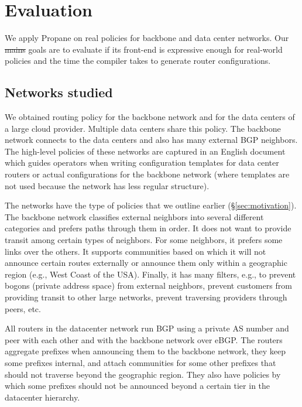 \documentclass{sig-alternate-10pt}
\newcommand{\sysname}{{\small \sf Propane}\xspace}
\providecommand{\DIFadd}[1]{{\protect\color{blue}\uwave{#1}}} %
\providecommand{\DIFdel}[1]{{\protect\color{red}\sout{#1}}}                      %
\providecommand{\DIFaddbegin}{} %
\providecommand{\DIFaddend}{} %
\providecommand{\DIFdelbegin}{} %
\providecommand{\DIFdelend}{} %
\begin{document}
\DIFdelend \section{Evaluation}
\label{sec:evaluation}


We apply \sysname on real policies for backbone and data center networks. Our \DIFdelbegin \DIFdel{mains }\DIFdelend \DIFaddbegin \DIFadd{main }\DIFaddend goals are to evaluate if its front-end is expressive enough for real-world policies and the time the compiler takes to generate router configurations.

\subsection{Networks studied}

We obtained routing policy for the backbone network and for the data centers of a large cloud provider. Multiple data centers share this policy. The backbone network connects to the data centers and also has many external BGP neighbors. The high-level policies of these networks are captured in an English document which guides operators when writing configuration templates for data center routers or actual configurations for the backbone network (where templates are not used because the network has less regular structure).

The networks have the type of policies that we outline earlier (\S\ref{sec:motivation}). The backbone network classifies external neighbors into several different categories and prefers paths through them in order. It does not want to provide transit among certain types of neighbors. For some neighbors, it prefers some links over the others. It supports communities based on which it will not announce certain routes externally or announce them only within a geographic region (e.g., West Coast of the USA). Finally, it has many filters, e.g., to prevent bogons (private address space) from external neighbors, prevent customers from providing transit to other large networks, prevent traversing providers through peers, etc.

All routers in the datacenter network run BGP using a private AS number and peer with each other and with the backbone network over eBGP. The routers aggregate prefixes when announcing them to the backbone network, they keep some prefixes internal, and attach communities for some other prefixes that should not traverse beyond the geographic region. They also have policies by which some prefixes should not be announced beyond a certain tier in the datacenter hierarchy.
\end{document}
